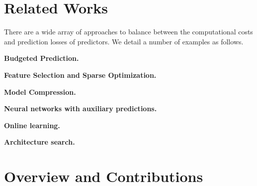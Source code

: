 \section{Related Works}
\label{sec:related_works}

There are a wide array of approaches to balance between the computational costs and prediction losses of predictors. We detail a number of examples as follows.


\textbf{Budgeted Prediction.}

\textbf{Feature Selection and Sparse Optimization.}

\textbf{Model Compression.}

\textbf{Neural networks with auxiliary predictions.}

\textbf{Online learning.} 

\textbf{Architecture search.}



\section{Overview and Contributions}

